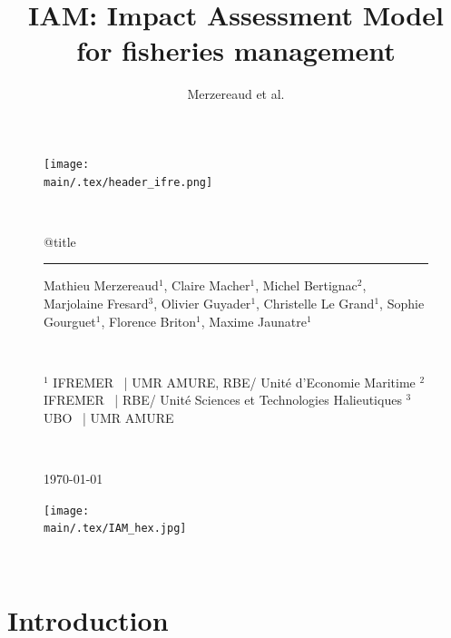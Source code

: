 \documentclass[12pt, colorinlistoftodos, notitlepage]{report}
\title{IAM: Impact Assessment Model for fisheries management}
\author{Merzereaud et al.}
\providecommand{\main}{.}  %
\newenvironment{not used}[1]{%
    \longtable{%
        |>{\centering$\displaystyle}A{#1}{1}<{$}%
        |}\hline\ignorespaces}{%
    \endlongtable\ignorespacesafterend}
\begin{document}
\thispagestyle{plain}

\begin{figure}[H]
    \texttt{[image: \\main/.tex/header\_ifre.png]}
    \par ~ \par
    \begin{minipage}{\textwidth}
        \begin{center}
            {\huge \csname @title\endcsname }
        \end{center}
        \rule{7em}{.4pt}\par
        Mathieu Merzereaud$^1$, Claire Macher$^1$, Michel Bertignac$^2$, Marjolaine Fresard$^3$, Olivier Guyader$^1$, Christelle Le Grand$^1$, Sophie Gourguet$^1$, Florence Briton$^1$, Maxime Jaunatre$^1$
        
        \par ~ \par
        $^1$ IFREMER ~| UMR AMURE, RBE/ Unité d'Economie Maritime \newline
        $^2$ IFREMER ~| RBE/ Unité Sciences et Technologies Halieutiques \newline
        $^3$ UBO ~| UMR AMURE
        \par ~ \par
        
        \begin{center}
            {\large \today }
            \vspace{10mm}

            \texttt{[image: \\main/.tex/IAM\_hex.jpg]}
        \end{center}

        
    \end{minipage}
\end{figure}
\vfill
\par ~ \par

\newpage

\hypertarget{toc}{}
{\let\clearpage\relax\tableofcontents} 
\newpage
{}

\section*{Introduction}
\end{document}
